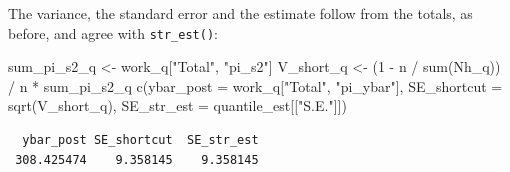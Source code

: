 \documentclass[
  letterpaper,
  DIV=11,
  numbers=noendperiod]{scrreprt}
\newenvironment{Shaded}{\begin{snugshade}}{\end{snugshade}}
\newcommand{\AttributeTok}[1]{\textcolor[rgb]{0.40,0.45,0.13}{#1}}
\newcommand{\DecValTok}[1]{\textcolor[rgb]{0.68,0.00,0.00}{#1}}
\newcommand{\FunctionTok}[1]{\textcolor[rgb]{0.28,0.35,0.67}{#1}}
\newcommand{\NormalTok}[1]{\textcolor[rgb]{0.00,0.23,0.31}{#1}}
\newcommand{\OtherTok}[1]{\textcolor[rgb]{0.00,0.23,0.31}{#1}}
\newcommand{\SpecialCharTok}[1]{\textcolor[rgb]{0.37,0.37,0.37}{#1}}
\newcommand{\StringTok}[1]{\textcolor[rgb]{0.13,0.47,0.30}{#1}}
\renewcommand{\[}{\begin{equation}}
\renewcommand{\]}{\end{equation}}
\begin{document}
\begin{table}

\caption{\label{tbl-agsrs-quantile-shortcut}Short-cut formula working
table: post-stratification by acres87 quantile groups}


\end{table}%

The variance, the standard error and the estimate follow from the
totals, as before, and agree with \texttt{str\_est()}:

\begin{Shaded}
\begin{Highlighting}[]
\NormalTok{sum\_pi\_s2\_q }\OtherTok{\textless{}{-}}\NormalTok{ work\_q[}\StringTok{"Total"}\NormalTok{, }\StringTok{"pi\_s2"}\NormalTok{]}
\NormalTok{V\_short\_q }\OtherTok{\textless{}{-}}\NormalTok{ (}\DecValTok{1} \SpecialCharTok{{-}}\NormalTok{ n }\SpecialCharTok{/} \FunctionTok{sum}\NormalTok{(Nh\_q)) }\SpecialCharTok{/}\NormalTok{ n }\SpecialCharTok{*}\NormalTok{ sum\_pi\_s2\_q}
\FunctionTok{c}\NormalTok{(}\AttributeTok{ybar\_post =}\NormalTok{ work\_q[}\StringTok{"Total"}\NormalTok{, }\StringTok{"pi\_ybar"}\NormalTok{], }\AttributeTok{SE\_shortcut =} \FunctionTok{sqrt}\NormalTok{(V\_short\_q), }\AttributeTok{SE\_str\_est =}\NormalTok{ quantile\_est[[}\StringTok{"S.E."}\NormalTok{]])}
\end{Highlighting}
\end{Shaded}

\begin{verbatim}
  ybar_post SE_shortcut  SE_str_est 
 308.425474    9.358145    9.358145 
\end{verbatim}
\end{document}
